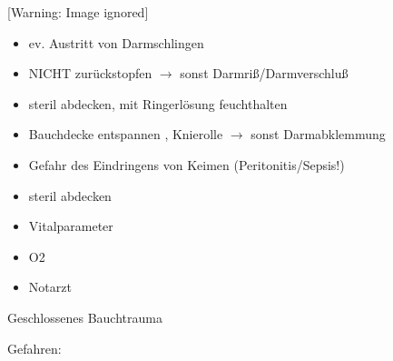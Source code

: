 \documentclass{article}
\begin{document}
\begin{center}
 [Warning: Image ignored] %

\end{center}
\begin{itemize}
\item {\mdseries
ev. Austritt von Darmschlingen}

\end{itemize}
\begin{itemize}
\item {\mdseries
NICHT  zur\"uckstopfen ${\rightarrow}$ sonst 
Darmri{\ss}/Darmverschlu{\ss}}

\item {\mdseries
steril abdecken, mit Ringerl\"osung feuchthalten}

\item {\mdseries
Bauchdecke entspannen , Knierolle ${\rightarrow}$ sonst  Darmabklemmung}

\end{itemize}
\begin{itemize}
\item {\mdseries
Gefahr des Eindringens von Keimen  (Peritonitis/Sepsis!)}

\end{itemize}
\begin{itemize}
\item {\mdseries\color[rgb]{0.0,0.0,0.5019608}
steril  abdecken}

\item {\mdseries\color[rgb]{0.0,0.0,0.5019608}
Vitalparameter}

\item {\mdseries\color[rgb]{0.0,0.0,0.5019608}
O2}

\item {\mdseries\color[rgb]{0.0,0.0,0.5019608}
Notarzt}

\end{itemize}
{\mdseries\color[rgb]{0.0,0.0,0.5019608}
Geschlossenes Bauchtrauma}

{\mdseries\color{black}
Gefahren:}
\end{document}
